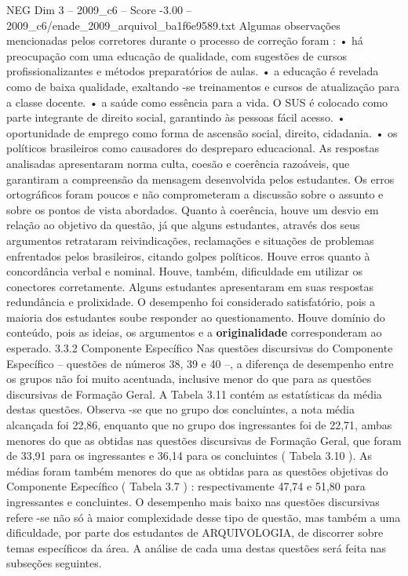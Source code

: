 \begin{textsample}{NEG Dim 3 – 2009\_c6 – Score -3.00 – 2009\_c6/enade\_2009\_arquivol\_ba1f6e9589.txt}
Algumas observações mencionadas pelos corretores durante o processo de correção foram : • há preocupação com uma educação de qualidade, com sugestões de cursos profissionalizantes e métodos preparatórios de aulas. • a educação é revelada como de baixa qualidade, exaltando -se treinamentos e cursos de atualização para a classe docente. • a saúde como essência para a vida.
O SUS é colocado como parte integrante de direito social, garantindo às pessoas fácil acesso. • oportunidade de emprego como forma de ascensão social, direito, cidadania. • os políticos brasileiros como causadores do despreparo educacional.
As respostas analisadas apresentaram norma culta, coesão e coerência razoáveis, que garantiram a compreensão da mensagem desenvolvida pelos estudantes.
Os erros ortográficos foram poucos e não comprometeram a discussão sobre o assunto e sobre os pontos de vista abordados.
Quanto à coerência, houve um desvio em relação ao objetivo da questão, já que alguns estudantes, através dos seus argumentos retrataram reivindicações, reclamações e situações de problemas enfrentados pelos brasileiros, citando golpes políticos.
Houve erros quanto à concordância verbal e nominal.
Houve, também, dificuldade em utilizar os conectores corretamente.
Alguns estudantes apresentaram em suas respostas redundância e prolixidade.
O desempenho foi considerado satisfatório, pois a maioria dos estudantes soube responder ao questionamento.
Houve domínio do conteúdo, pois as ideias, os argumentos e a \textbf{originalidade} corresponderam ao esperado. 3.3.2 Componente Específico Nas questões discursivas do Componente Específico – questões de números 38, 39 e 40 –, a diferença de desempenho entre os grupos não foi muito acentuada, inclusive menor do que para as questões discursivas de Formação Geral.
A Tabela 3.11 contém as estatísticas da média destas questões.
Observa -se que no grupo dos concluintes, a nota média alcançada foi 22,86, enquanto que no grupo dos ingressantes foi de 22,71, ambas menores do que as obtidas nas questões discursivas de Formação Geral, que foram de 33,91 para os ingressantes e 36,14 para os concluintes ( Tabela 3.10 ).
As médias foram também menores do que as obtidas para as questões objetivas do Componente Específico ( Tabela 3.7 ) : respectivamente 47,74 e 51,80 para ingressantes e concluintes.
O desempenho mais baixo nas questões discursivas refere -se não só à maior complexidade desse tipo de questão, mas também a uma dificuldade, por parte dos estudantes de ARQUIVOLOGIA, de discorrer sobre temas específicos da área.
A análise de cada uma destas questões será feita nas subseções seguintes.

\end{textsample}
